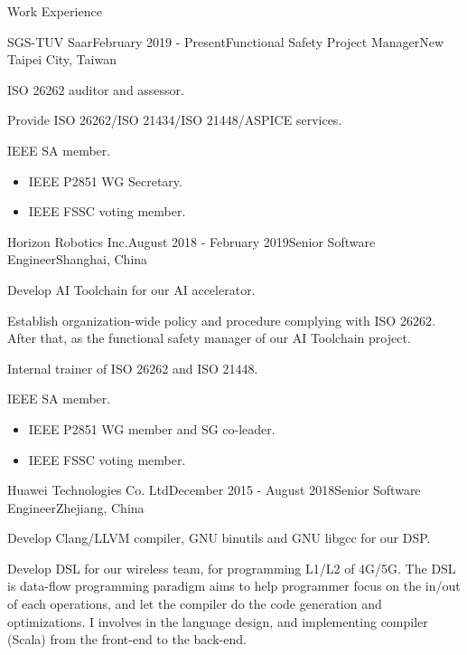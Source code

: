 \documentclass{resume} %
\begin{document}
\begin{rSection}{Work Experience}

\begin{rSubsection}{SGS-TUV Saar}{February 2019 - Present}{Functional Safety Project Manager}{New Taipei City, Taiwan}
\item ISO 26262 auditor and assessor.
\item Provide ISO 26262/ISO 21434/ISO 21448/ASPICE services.
\item IEEE SA member.
\begin{itemize}
\item IEEE P2851 WG Secretary.
\item IEEE FSSC voting member.
\end{itemize}
\end{rSubsection}

\begin{rSubsection}{Horizon Robotics Inc.}{August 2018 - February 2019}{Senior Software Engineer}{Shanghai, China}
\item Develop AI Toolchain for our AI accelerator.
\item Establish organization-wide policy and procedure complying with ISO 26262. After that, as the functional safety manager of our AI Toolchain project.
\item Internal trainer of ISO 26262 and ISO 21448.
\item IEEE SA member.
\begin{itemize}
\item IEEE P2851 WG member and SG co-leader.
\item IEEE FSSC voting member.
\end{itemize}
\end{rSubsection}


\begin{rSubsection}{Huawei Technologies Co. Ltd}{December 2015 - August 2018}{Senior Software Engineer}{Zhejiang, China}
\item Develop Clang/LLVM compiler, GNU binutils and GNU libgcc for our DSP.
\item Develop DSL for our wireless team, for programming L1/L2 of 4G/5G. The DSL is data-flow programming paradigm aims to help programmer focus on the in/out of each operations, and let the compiler do the code generation and optimizations. I involves in the language design, and implementing compiler (Scala) from the front-end to the back-end.
\end{rSubsection}


\end{rSection}
\end{document}
